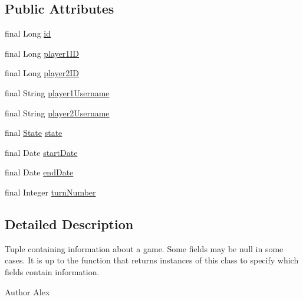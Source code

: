 \subsection*{Public Attributes}
\begin{DoxyCompactItemize}
\item 
final Long \hyperlink{classpt_1_1up_1_1fe_1_1lpro1613_1_1sharedlib_1_1tuples_1_1_game_info_a09391412307fc262741c17fd850c8f4a}{id}
\item 
final Long \hyperlink{classpt_1_1up_1_1fe_1_1lpro1613_1_1sharedlib_1_1tuples_1_1_game_info_a4bfc686de26be1a765aef31922211cb5}{player1\+ID}
\item 
final Long \hyperlink{classpt_1_1up_1_1fe_1_1lpro1613_1_1sharedlib_1_1tuples_1_1_game_info_ae633a96ef35d188e7e29e49345b4fc03}{player2\+ID}
\item 
final String \hyperlink{classpt_1_1up_1_1fe_1_1lpro1613_1_1sharedlib_1_1tuples_1_1_game_info_a413baca7d49fe7f174d23340cedbacae}{player1\+Username}
\item 
final String \hyperlink{classpt_1_1up_1_1fe_1_1lpro1613_1_1sharedlib_1_1tuples_1_1_game_info_acc5ef9716a5e4a617ac6c1f933671ae7}{player2\+Username}
\item 
final \hyperlink{enumpt_1_1up_1_1fe_1_1lpro1613_1_1sharedlib_1_1tuples_1_1_game_info_1_1_state}{State} \hyperlink{classpt_1_1up_1_1fe_1_1lpro1613_1_1sharedlib_1_1tuples_1_1_game_info_a6d72077011e1d1a256122303e3de30a2}{state}
\item 
final Date \hyperlink{classpt_1_1up_1_1fe_1_1lpro1613_1_1sharedlib_1_1tuples_1_1_game_info_ad3627168ab897d22ef4aae26dece978c}{start\+Date}
\item 
final Date \hyperlink{classpt_1_1up_1_1fe_1_1lpro1613_1_1sharedlib_1_1tuples_1_1_game_info_acdcfafc4db0d610fe2112364076f4518}{end\+Date}
\item 
final Integer \hyperlink{classpt_1_1up_1_1fe_1_1lpro1613_1_1sharedlib_1_1tuples_1_1_game_info_a349ec3d27f0af9d2a569f5e4149af99c}{turn\+Number}
\end{DoxyCompactItemize}


\subsection{Detailed Description}
Tuple containing information about a game. Some fields may be null in some cases. It is up to the function that returns instances of this class to specify which fields contain information.

\begin{DoxyAuthor}{Author}
Alex 
\end{DoxyAuthor}


